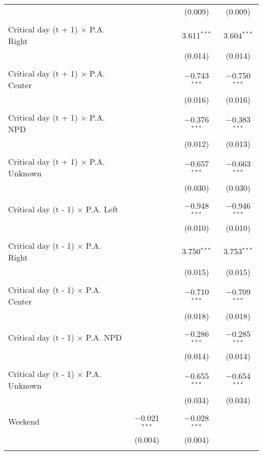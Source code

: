 \documentclass[
]{article}
\begin{document}
\begin{table}[!htbp]
{\begin{tabular}{@{\extracolsep{5pt}}lcccc}
  &  &  & (0.009) & (0.009) \\ 
  & & & & \\ 
 Critical day (t + 1) $\times$ P.A. Right &  &  & 3.611$^{***}$ & 3.604$^{***}$ \\ 
  &  &  & (0.014) & (0.014) \\ 
  & & & & \\ 
 Critical day (t + 1) $\times$ P.A. Center &  &  & $-$0.743$^{***}$ & $-$0.750$^{***}$ \\ 
  &  &  & (0.016) & (0.016) \\ 
  & & & & \\ 
 Critical day (t + 1) $\times$ P.A. NPD &  &  & $-$0.376$^{***}$ & $-$0.383$^{***}$ \\ 
  &  &  & (0.012) & (0.013) \\ 
  & & & & \\ 
 Critical day (t + 1) $\times$ P.A. Unknown &  &  & $-$0.657$^{***}$ & $-$0.663$^{***}$ \\ 
  &  &  & (0.030) & (0.030) \\ 
  & & & & \\ 
 Critical day (t - 1) $\times$ P.A. Left &  &  & $-$0.948$^{***}$ & $-$0.946$^{***}$ \\ 
  &  &  & (0.010) & (0.010) \\ 
  & & & & \\ 
 Critical day (t - 1) $\times$ P.A. Right &  &  & 3.750$^{***}$ & 3.753$^{***}$ \\ 
  &  &  & (0.015) & (0.015) \\ 
  & & & & \\ 
 Critical day (t - 1) $\times$ P.A. Center &  &  & $-$0.710$^{***}$ & $-$0.709$^{***}$ \\ 
  &  &  & (0.018) & (0.018) \\ 
  & & & & \\ 
 Critical day (t - 1) $\times$ P.A. NPD &  &  & $-$0.286$^{***}$ & $-$0.285$^{***}$ \\ 
  &  &  & (0.014) & (0.014) \\ 
  & & & & \\ 
 Critical day (t - 1) $\times$ P.A. Unknown &  &  & $-$0.655$^{***}$ & $-$0.654$^{***}$ \\ 
  &  &  & (0.034) & (0.034) \\ 
  & & & & \\ 
 Weekend & $-$0.021$^{***}$ &  & $-$0.028$^{***}$ &  \\ 
  & (0.004) &  & (0.004) &  \\ 
  & & & & \\ 

\end{tabular}}
\end{table}
\end{document}
